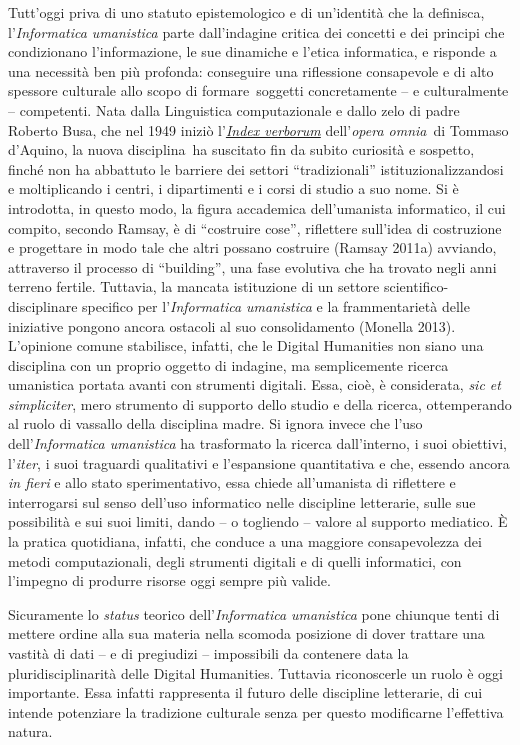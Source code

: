 \documentclass[
  b5paper,
  twoside,
  12pt,
  chapterprefix=false,
  bibliography=totocnumbered,
  parskip=false]{scrbook}
\begin{document}
Tutt'oggi priva di uno statuto epistemologico e di un'identità che la
definisca, l'\emph{Informatica umanistica} parte dall'indagine critica dei
concetti e dei principi che condizionano l'informazione, le sue
dinamiche e l'etica informatica, e risponde a una necessità ben più
profonda: conseguire una riflessione consapevole e di alto spessore
culturale allo scopo di formare~soggetti concretamente -- e
culturalmente -- competenti. Nata dalla Linguistica computazionale e
dallo zelo di padre Roberto Busa, che nel 1949 iniziò l'\href{http://www.corpusthomisticum.org/it/index.age}{\emph{Index
verborum}} dell'\emph{opera
omnia}~di Tommaso d'Aquino, la nuova disciplina~ha suscitato fin da
subito curiosità e sospetto, finché non ha abbattuto le barriere dei
settori \enquote{tradizionali} istituzionalizzandosi e moltiplicando i centri, i
dipartimenti e i corsi di studio a suo nome. Si è introdotta, in questo
modo, la figura accademica dell'umanista informatico, il cui compito,
secondo Ramsay, è di \enquote{costruire cose}, riflettere sull'idea di
costruzione e progettare in modo tale che altri possano costruire
(Ramsay 2011a) avviando, attraverso il processo di \enquote{building}, una fase
evolutiva che ha trovato negli anni terreno fertile. Tuttavia, la
mancata istituzione di un settore scientifico-disciplinare specifico per
l'\emph{Informatica umanistica} e la frammentarietà delle iniziative pongono
ancora ostacoli al suo consolidamento (Monella 2013). L'opinione comune
stabilisce, infatti, che le Digital Humanities non siano una disciplina
con un proprio oggetto di indagine, ma semplicemente ricerca umanistica
portata avanti con strumenti digitali. Essa, cioè, è considerata, \emph{sic
et simpliciter}, mero strumento di supporto dello studio e della
ricerca, ottemperando al ruolo di vassallo della disciplina madre. Si
ignora invece che l'uso dell'\emph{Informatica umanistica} ha trasformato la
ricerca dall'interno, i suoi obiettivi, l'\emph{iter}, i suoi traguardi
qualitativi e l'espansione quantitativa e che, essendo ancora \emph{in fieri}
e allo stato sperimentativo, essa chiede all'umanista di riflettere e
interrogarsi sul senso dell'uso informatico nelle discipline letterarie,
sulle sue possibilità e sui suoi limiti, dando -- o togliendo -- valore
al supporto mediatico. È la pratica quotidiana, infatti, che conduce a
una maggiore consapevolezza dei metodi computazionali, degli strumenti
digitali e di quelli informatici, con l'impegno di produrre risorse oggi
sempre più valide.

Sicuramente lo \emph{status} teorico dell'\emph{Informatica umanistica} pone
chiunque tenti di mettere ordine alla sua materia nella scomoda
posizione di dover trattare una vastità di dati -- e di pregiudizi --
impossibili da contenere data la pluridisciplinarità delle Digital
Humanities. Tuttavia riconoscerle un ruolo è oggi importante. Essa
infatti rappresenta il futuro delle discipline letterarie, di cui
intende potenziare la tradizione culturale senza per questo modificarne
l'effettiva natura.
\end{document}
